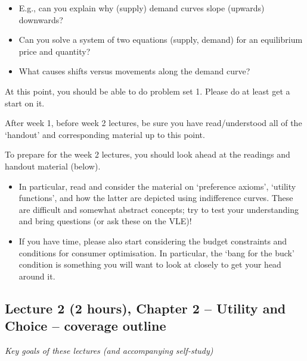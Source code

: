 \documentclass[]{article}
\begin{document}
\begin{itemize}
\item
  E.g., can you explain why (supply) demand curves slope (upwards) downwards?
\item
  Can you solve a system of two equations (supply, demand) for an equilibrium price and quantity?
\item
  What causes shifts versus movements along the demand curve?
\end{itemize}

At this point, you should be able to do problem set 1. Please do at least get a start on it.

After week 1, before week 2 lectures, be sure you have read/understood all of the `handout' and corresponding material up to this point.

To prepare for the week 2 lectures, you should look ahead at the readings and handout material (below).

\begin{itemize}
\item
  In particular, read and consider the material on `preference axioms', `utility functions', and how the latter are depicted using indifference curves. These are difficult and somewhat abstract concepts; try to test your understanding and bring questions (or ask these on the VLE)!
\item
  If you have time, please also start considering the budget constraints and conditions for consumer optimisation. In particular, the `bang for the buck' condition is something you will want to look at closely to get your head around it.
\end{itemize}

\hypertarget{lecture-2-2-hours-chapter-2-utility-and-choice-coverage-outline}{%
\subsection{Lecture 2 (2 hours), Chapter 2 -- Utility and Choice -- coverage outline}\label{lecture-2-2-hours-chapter-2-utility-and-choice-coverage-outline}}

\emph{Key goals of these lectures (and accompanying self-study)}
\end{document}
